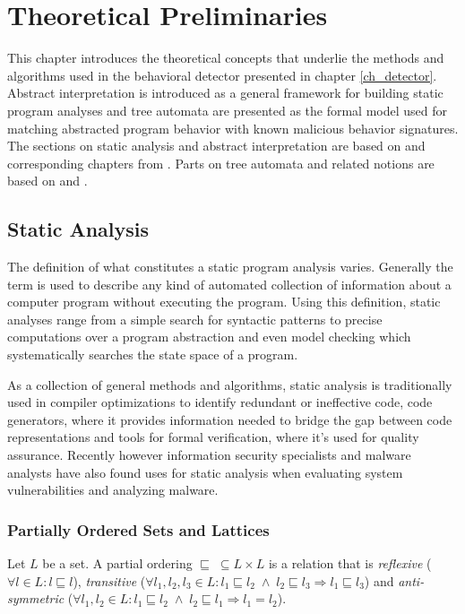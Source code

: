 \chapter{Theoretical Preliminaries}
\label{ch_math}
This chapter introduces the theoretical concepts that underlie the methods and algorithms used in the behavioral detector presented in chapter \ref{ch_detector}. Abstract interpretation is introduced as a general framework for building static program analyses and tree automata are presented as the formal model used for matching abstracted program behavior with known malicious behavior signatures. The sections on static analysis and abstract interpretation are based on \cite{FAV_Slides16} and corresponding chapters from \cite{Nielson05}. Parts on tree automata and related notions are based on \cite{tata07} and \cite{Babic11}.

\section{Static Analysis}
The definition of what constitutes a static program analysis varies. Generally the term is used to describe any kind of automated collection of information about a computer program without executing the program. Using this definition, static analyses range from a simple search for syntactic patterns to precise computations over a program abstraction and even model checking which systematically searches the state space of a program.

As a collection of general methods and algorithms, static analysis is traditionally used in compiler optimizations to identify redundant or ineffective code, code generators, where it provides information needed to bridge the gap between code representations and tools for formal verification, where it's used for quality assurance. Recently however information security specialists and malware analysts have also found uses for static analysis when evaluating system vulnerabilities and analyzing malware.

\subsection{Partially Ordered Sets and Lattices}
\begin{defn}
Let $L$ be a set. A partial ordering $\sqsubseteq \; \subseteq L \times L$ is a relation that is \emph{reflexive} ($\forall l \in L: l \sqsubseteq l$), \emph{transitive} ($\forall l_1, l_2, l_3 \in L: l_1 \sqsubseteq l_2 \; \wedge \; l_2 \sqsubseteq l_3 \Rightarrow l_1 \sqsubseteq l_3$) and \emph{anti-symmetric} ($\forall l_1, l_2 \in L: l_1 \sqsubseteq l_2 \; \wedge \; l_2 \sqsubseteq l_1 \Rightarrow l_1 = l_2$).
\end{defn}

